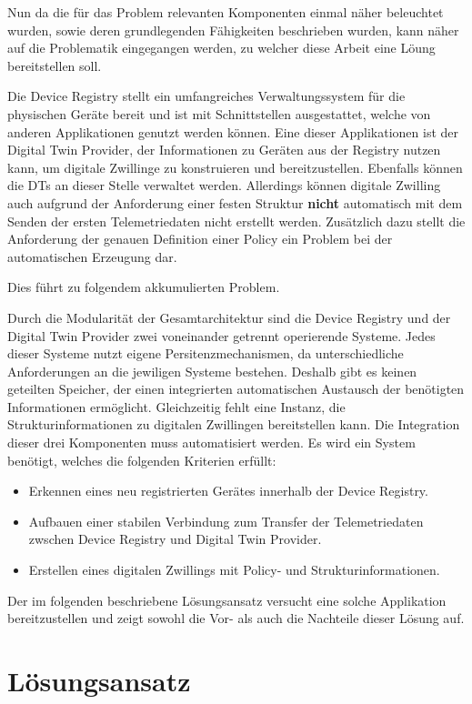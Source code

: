 Nun da die für das Problem relevanten Komponenten einmal näher beleuchtet wurden, sowie deren grundlegenden Fähigkeiten beschrieben wurden, kann näher auf die Problematik eingegangen werden, zu welcher diese Arbeit eine Löung bereitstellen soll. 

Die Device Registry stellt ein umfangreiches Verwaltungssystem für die physischen Geräte bereit und ist mit Schnittstellen ausgestattet, welche von anderen Applikationen genutzt werden können. Eine dieser Applikationen ist der Digital Twin Provider, der Informationen zu Geräten aus der Registry nutzen kann, um digitale Zwillinge zu konstruieren und bereitzustellen. Ebenfalls können die \ac{DT}s an dieser Stelle verwaltet werden. Allerdings können digitale Zwilling auch aufgrund der Anforderung einer festen Struktur \textbf{nicht} automatisch mit dem Senden der ersten Telemetriedaten nicht erstellt werden. Zusätzlich dazu stellt die Anforderung der genauen Definition einer Policy ein Problem bei der automatischen Erzeugung dar.

Dies führt zu folgendem akkumulierten Problem.

\begin{problem}
    Durch die Modularität der Gesamtarchitektur sind die Device Registry und der Digital Twin Provider zwei voneinander getrennt operierende Systeme. Jedes dieser Systeme nutzt eigene Persitenzmechanismen, da unterschiedliche Anforderungen an die jewiligen Systeme bestehen. Deshalb gibt es keinen geteilten Speicher, der einen integrierten automatischen Austausch der benötigten Informationen ermöglicht. Gleichzeitig fehlt eine Instanz, die Strukturinformationen zu digitalen Zwillingen bereitstellen kann. Die Integration dieser drei Komponenten muss automatisiert werden. Es wird ein System benötigt, welches die folgenden Kriterien erfüllt:

    \begin{itemize}
        \item Erkennen eines neu registrierten Gerätes innerhalb der Device Registry.
        \item Aufbauen einer stabilen Verbindung zum Transfer der Telemetriedaten zwschen Device Registry und Digital Twin Provider.
        \item Erstellen eines digitalen Zwillings mit Policy- und Strukturinformationen.
    \end{itemize}
\end{problem}

Der im folgenden beschriebene Lösungsansatz versucht eine solche Applikation bereitzustellen und zeigt sowohl die Vor- als auch die Nachteile dieser Lösung auf.

\section{Lösungsansatz}



